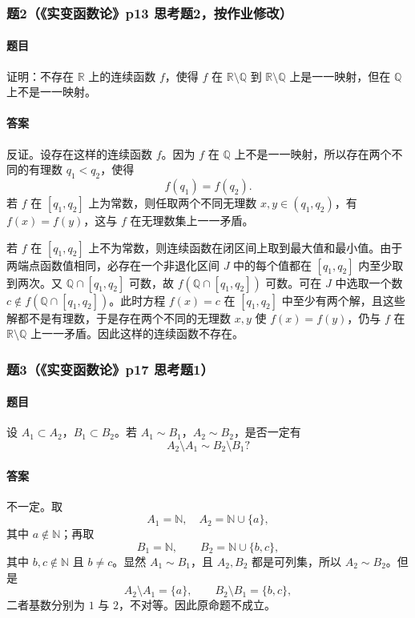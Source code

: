 \documentclass{article}
\newcommand{\R}{\mathbb{R}}
\newcommand{\Q}{\mathbb{Q}}
\newcommand{\N}{\mathbb{N}}
\begin{document}
	\subsubsection*{题2（《实变函数论》p13 思考题2，按作业修改）}
	\paragraph{题目}证明：不存在 $\R$ 上的连续函数 $f$，使得 $f$ 在 $\R\setminus\Q$ 到 $\R\setminus\Q$ 上是一一映射，但在 $\Q$ 上不是一一映射。
	
	\paragraph{答案}反证。设存在这样的连续函数 $f$。因为 $f$ 在 $\Q$ 上不是一一映射，所以存在两个不同的有理数 $q_1<q_2$，使得
	\[
	f(q_1)=f(q_2).
	\]
	若 $f$ 在 $[q_1,q_2]$ 上为常数，则任取两个不同无理数 $x,y\in(q_1,q_2)$，有 $f(x)=f(y)$，这与 $f$ 在无理数集上一一矛盾。
	
	若 $f$ 在 $[q_1,q_2]$ 上不为常数，则连续函数在闭区间上取到最大值和最小值。由于两端点函数值相同，必存在一个非退化区间 $J$ 中的每个值都在 $[q_1,q_2]$ 内至少取到两次。又 $\Q\cap[q_1,q_2]$ 可数，故 $f(\Q\cap[q_1,q_2])$ 可数。可在 $J$ 中选取一个数 $c\notin f(\Q\cap[q_1,q_2])$。此时方程 $f(x)=c$ 在 $[q_1,q_2]$ 中至少有两个解，且这些解都不是有理数，于是存在两个不同的无理数 $x,y$ 使 $f(x)=f(y)$，仍与 $f$ 在 $\R\setminus\Q$ 上一一矛盾。因此这样的连续函数不存在。
	
	\subsubsection*{题3（《实变函数论》p17 思考题1）}
	\paragraph{题目}设 $A_1\subset A_2$，$B_1\subset B_2$。若 $A_1\sim B_1$，$A_2\sim B_2$，是否一定有
	\[
	A_2\setminus A_1\sim B_2\setminus B_1?
	\]
	
	\paragraph{答案}不一定。取
	\[
	A_1=\N,\quad A_2=\N\cup\{a\},
	\]
	其中 $a\notin\N$；再取
	\[
	B_1=\N,
	\qquad B_2=\N\cup\{b,c\},
	\]
	其中 $b,c\notin\N$ 且 $b\ne c$。显然 $A_1\sim B_1$，且 $A_2,B_2$ 都是可列集，所以 $A_2\sim B_2$。但是
	\[
	A_2\setminus A_1=\{a\},\qquad B_2\setminus B_1=\{b,c\},
	\]
	二者基数分别为 $1$ 与 $2$，不对等。因此原命题不成立。
	
\end{document}
